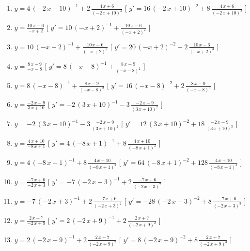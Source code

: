 \begin{esercizio}
\begin{enumerate}
\item $y= 4\, \left( -2\,x+10 \right) ^{-1}+2\,{\frac {4\,x+6}{ \left( -2\,x+10 \right) ^{2}}} $ \hfill [ $y'= 16\, \left( -2\,x+10 \right) ^{-2}+8\,{\frac {4\,x+6}{ \left( -2\,x+10 \right) ^{3}}}$ ]
\item $y= {\frac {10\,x-6}{-x+2}} $ \hfill [ $y'= 10\, \left( -x+2 \right) ^{-1}+{\frac {10\,x-6}{ \left( -x+2 \right) ^{2}}}$ ]
\item $y= 10\, \left( -x+2 \right) ^{-1}+{\frac {10\,x-6}{ \left( -x+2 \right) ^{2}}} $ \hfill [ $y'= 20\, \left( -x+2 \right) ^{-2}+2\,{\frac {10\,x-6}{ \left( -x+2 \right) ^{3}}}$ ]
\item $y= {\frac {8\,x-9}{-x-8}} $ \hfill [ $y'= 8\, \left( -x-8 \right) ^{-1}+{\frac {8\,x-9}{ \left( -x-8 \right) ^{2}}}$ ]
\item $y= 8\, \left( -x-8 \right) ^{-1}+{\frac {8\,x-9}{ \left( -x-8 \right) ^{2}}} $ \hfill [ $y'= 16\, \left( -x-8 \right) ^{-2}+2\,{\frac {8\,x-9}{ \left( -x-8 \right) ^{3}}}$ ]
\item $y= {\frac {-2\,x-9}{3\,x+10}} $ \hfill [ $y'= -2\, \left( 3\,x+10 \right) ^{-1}-3\,{\frac {-2\,x-9}{ \left( 3\,x+10 \right) ^{2}}}$ ]
\item $y= -2\, \left( 3\,x+10 \right) ^{-1}-3\,{\frac {-2\,x-9}{ \left( 3\,x+10 \right) ^{2}}} $ \hfill [ $y'= 12\, \left( 3\,x+10 \right) ^{-2}+18\,{\frac {-2\,x-9}{ \left( 3\,x+10 \right) ^{3}}}$ ]
\item $y= {\frac {4\,x+10}{-8\,x+1}} $ \hfill [ $y'= 4\, \left( -8\,x+1 \right) ^{-1}+8\,{\frac {4\,x+10}{ \left( -8\,x+1 \right) ^{2}}}$ ]
\item $y= 4\, \left( -8\,x+1 \right) ^{-1}+8\,{\frac {4\,x+10}{ \left( -8\,x+1 \right) ^{2}}} $ \hfill [ $y'= 64\, \left( -8\,x+1 \right) ^{-2}+128\,{\frac {4\,x+10}{ \left( -8\,x+1 \right) ^{3}}}$ ]
\item $y= {\frac {-7\,x+6}{-2\,x+3}} $ \hfill [ $y'= -7\, \left( -2\,x+3 \right) ^{-1}+2\,{\frac {-7\,x+6}{ \left( -2\,x+3 \right) ^{2}}}$ ]
\item $y= -7\, \left( -2\,x+3 \right) ^{-1}+2\,{\frac {-7\,x+6}{ \left( -2\,x+3 \right) ^{2}}} $ \hfill [ $y'= -28\, \left( -2\,x+3 \right) ^{-2}+8\,{\frac {-7\,x+6}{ \left( -2\,x+3 \right) ^{3}}}$ ]
\item $y= {\frac {2\,x+7}{-2\,x+9}} $ \hfill [ $y'= 2\, \left( -2\,x+9 \right) ^{-1}+2\,{\frac {2\,x+7}{ \left( -2\,x+9 \right) ^{2}}}$ ]
\item $y= 2\, \left( -2\,x+9 \right) ^{-1}+2\,{\frac {2\,x+7}{ \left( -2\,x+9 \right) ^{2}}} $ \hfill [ $y'= 8\, \left( -2\,x+9 \right) ^{-2}+8\,{\frac {2\,x+7}{ \left( -2\,x+9 \right) ^{3}}}$ ]

\end{enumerate}
\end{esercizio}
